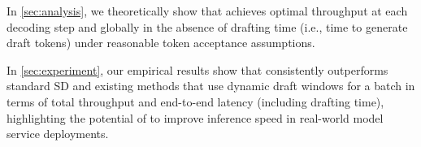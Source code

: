     \item In \cref{sec:analysis}, we theoretically show that \alg{} achieves optimal throughput at each decoding step and globally in the absence of drafting time (i.e., time to generate draft tokens) under reasonable token acceptance assumptions.

    \item In \cref{sec:experiment}, our empirical results show that \alg{} consistently outperforms standard SD and existing methods that use dynamic draft windows for a batch in terms of total throughput and end-to-end latency (including drafting time), highlighting the potential of \alg{} to improve inference speed in real-world model service deployments.
\squishend
